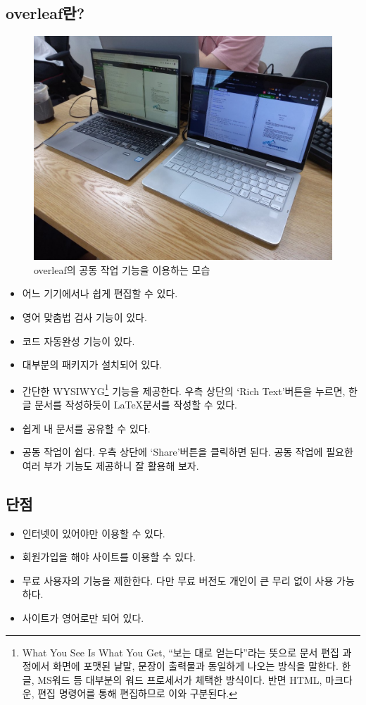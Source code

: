 \documentclass[chapter, oneside]{oblivoir}
\begin{document}
\subsection{overleaf란?}
\begin{figure}[h!]
\centering
\includegraphics[width=.7\textwidth]{img/5/overleaf_shere.jpg}
\caption{overleaf의 공동 작업 기능을 이용하는 모습}
\label{overleaf:shere}
\end{figure}

\begin{itemize}
\item  어느 기기에서나 쉽게  편집할 수 있다.
\item  영어 맞춤법 검사 기능이 있다.
\item  코드 자동완성 기능이 있다.
\item  대부분의 패키지가 설치되어 있다.
\item  간단한 WYSIWYG\footnote{What You See Is What You Get, ``보는 대로 얻는다''라는 뜻으로 문서 편집 과정에서 화면에 포맷된 낱말, 문장이 출력물과 동일하게 나오는 방식을 말한다. 한글, MS워드 등 대부분의 워드 프로세서가 체택한 방식이다. 반면 HTML, 마크다운,  편집 명령어를 통해 편집하므로 이와 구분된다.}
기능을 제공한다. 우측 상단의 `Rich Text'버튼을 누르면, 한글 문서를 작성하듯이 \LaTeX 문서를 작성할 수 있다.
\item 쉽게 내 문서를 공유할 수 있다.
\item  공동 작업이 쉽다. 우측 상단에 `Share'버튼을 클릭하면 된다. 공동 작업에 필요한 여러 부가 기능도 제공하니 잘 활용해 보자.
\end{itemize}


\subsection{단점}
\begin{itemize}
    \item  인터넷이 있어야만 이용할 수 있다.
    \item  회원가입을 해야 사이트를 이용할 수 있다.
    \item  무료 사용자의 기능을 제한한다. 다만 무료 버전도 개인이  큰 무리 없이 사용 가능하다.
    \item 사이트가 영어로만 되어 있다.
\end{itemize}
\end{document}

